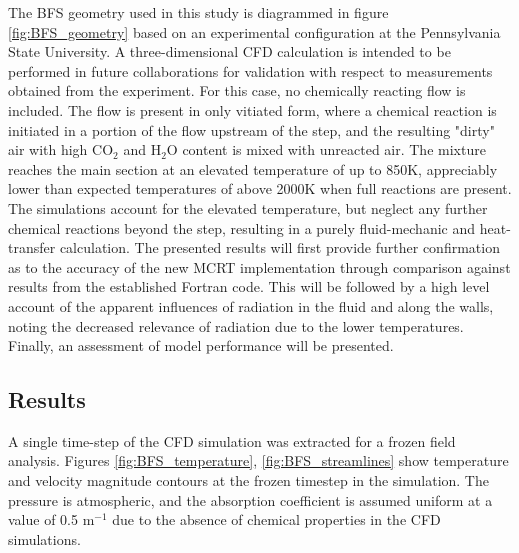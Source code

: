 The BFS geometry used in this study is diagrammed in figure \ref{fig:BFS_geometry} based on an experimental configuration at the Pennsylvania State University.
A three-dimensional CFD calculation is intended to be performed in future collaborations for validation with respect to measurements obtained from the experiment. For this case, no chemically reacting flow is included. 
The flow is present in only vitiated form, where a chemical reaction is initiated in a portion of the flow upstream of the step, and the resulting "dirty" air with high CO$_2$ and H$_2$O content is mixed with unreacted air. 
The mixture reaches the main section at an elevated temperature of up to 850K, appreciably lower than expected temperatures of above 2000K when full reactions are present. 
The simulations account for the elevated temperature, but neglect any further chemical reactions beyond the step, resulting in a purely fluid-mechanic and heat-transfer calculation.
The presented results will first provide further confirmation as to the accuracy of the new MCRT implementation through comparison against results from the established Fortran code. This will be followed by a high level account of the apparent influences of radiation in the fluid and along the walls, noting the decreased relevance of radiation due to the lower temperatures. Finally, an assessment of model performance will be presented.



\subsection{Results}
A single time-step of the CFD simulation was extracted for a frozen field analysis. 
Figures \ref{fig:BFS_temperature}, \ref{fig:BFS_streamlines} show temperature and velocity magnitude contours at the frozen timestep in the simulation. The pressure is atmospheric, and the absorption coefficient is assumed uniform at a value of 0.5 m$^{-1}$ due to the absence of chemical properties in the CFD simulations.

